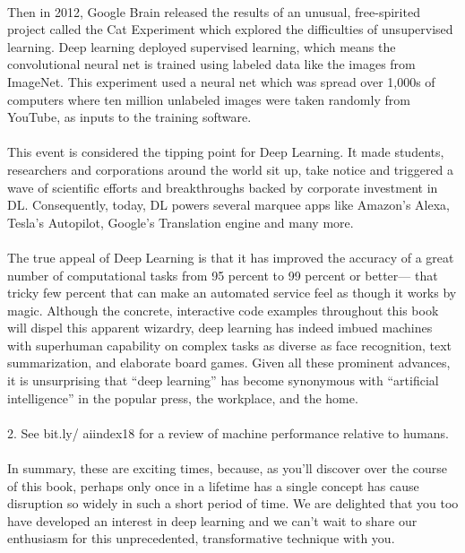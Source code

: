 \documentclass[12pt,a4paper]{article}
\begin{document}
\paragraph{}
Then in 2012, Google Brain released the results of an unusual, free-spirited project called the Cat Experiment which explored the difficulties of unsupervised learning. Deep learning deployed supervised learning, which means the convolutional neural net is trained using labeled data like the images from ImageNet. This experiment used a neural net which was spread over 1,000s of computers where ten million unlabeled images were taken randomly from YouTube, as inputs to the training software.  
\paragraph{}
This event is considered the tipping point for Deep Learning. It made students, researchers and corporations around the world sit up, take notice and triggered a wave of scientific efforts and breakthroughs backed by corporate investment in DL. Consequently, today, DL powers several marquee apps like Amazon’s Alexa, Tesla’s Autopilot, Google’s Translation engine and many more. 
\paragraph{}
The true appeal of Deep Learning is that it has improved the accuracy of a great number of computational tasks from 95 percent to 99 percent or better— that tricky few percent that can make an automated service feel as though it works by magic. Although the concrete, interactive code examples throughout this book will dispel this apparent wizardry, deep learning has indeed imbued machines with superhuman capability on complex tasks as diverse as face recognition, text summarization, and elaborate board games. Given all these prominent advances, it is unsurprising that “deep learning” has become synonymous with “artificial intelligence” in the popular press, the workplace, and the home.
\paragraph{}
2. See bit.ly/ aiindex18 for a review of machine performance relative to humans.
\paragraph{}
In summary, these are exciting times, because, as you’ll discover over the course of this book, perhaps only once in a lifetime has a single concept has cause disruption so widely in such a short period of time. We are delighted that you too have developed an interest in deep learning and we can’t wait to share our enthusiasm for this unprecedented, transformative technique with you.
\end{document}
